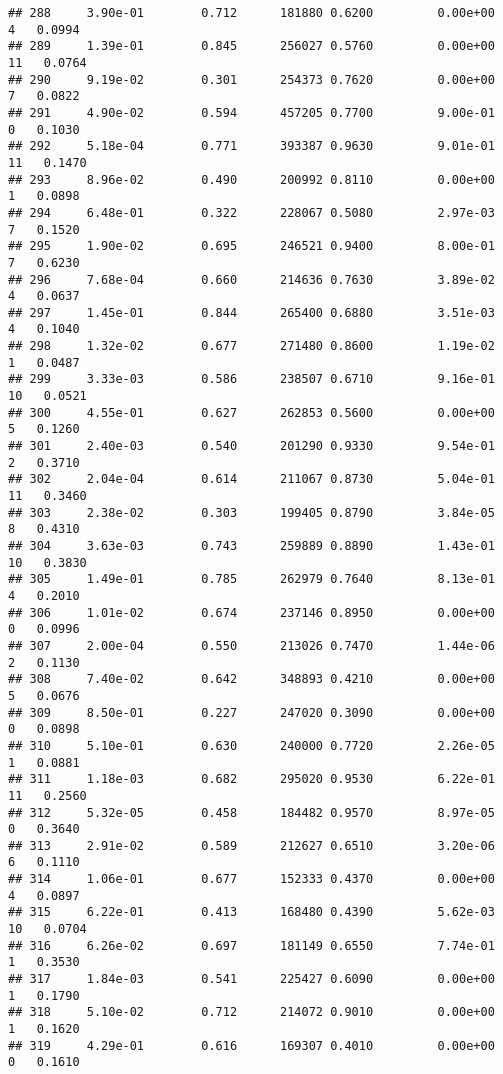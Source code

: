 \documentclass[
]{article}
\begin{document}
\begin{verbatim}
## 288     3.90e-01        0.712      181880 0.6200         0.00e+00   4   0.0994
## 289     1.39e-01        0.845      256027 0.5760         0.00e+00  11   0.0764
## 290     9.19e-02        0.301      254373 0.7620         0.00e+00   7   0.0822
## 291     4.90e-02        0.594      457205 0.7700         9.00e-01   0   0.1030
## 292     5.18e-04        0.771      393387 0.9630         9.01e-01  11   0.1470
## 293     8.96e-02        0.490      200992 0.8110         0.00e+00   1   0.0898
## 294     6.48e-01        0.322      228067 0.5080         2.97e-03   7   0.1520
## 295     1.90e-02        0.695      246521 0.9400         8.00e-01   7   0.6230
## 296     7.68e-04        0.660      214636 0.7630         3.89e-02   4   0.0637
## 297     1.45e-01        0.844      265400 0.6880         3.51e-03   4   0.1040
## 298     1.32e-02        0.677      271480 0.8600         1.19e-02   1   0.0487
## 299     3.33e-03        0.586      238507 0.6710         9.16e-01  10   0.0521
## 300     4.55e-01        0.627      262853 0.5600         0.00e+00   5   0.1260
## 301     2.40e-03        0.540      201290 0.9330         9.54e-01   2   0.3710
## 302     2.04e-04        0.614      211067 0.8730         5.04e-01  11   0.3460
## 303     2.38e-02        0.303      199405 0.8790         3.84e-05   8   0.4310
## 304     3.63e-03        0.743      259889 0.8890         1.43e-01  10   0.3830
## 305     1.49e-01        0.785      262979 0.7640         8.13e-01   4   0.2010
## 306     1.01e-02        0.674      237146 0.8950         0.00e+00   0   0.0996
## 307     2.00e-04        0.550      213026 0.7470         1.44e-06   2   0.1130
## 308     7.40e-02        0.642      348893 0.4210         0.00e+00   5   0.0676
## 309     8.50e-01        0.227      247020 0.3090         0.00e+00   0   0.0898
## 310     5.10e-01        0.630      240000 0.7720         2.26e-05   1   0.0881
## 311     1.18e-03        0.682      295020 0.9530         6.22e-01  11   0.2560
## 312     5.32e-05        0.458      184482 0.9570         8.97e-05   0   0.3640
## 313     2.91e-02        0.589      212627 0.6510         3.20e-06   6   0.1110
## 314     1.06e-01        0.677      152333 0.4370         0.00e+00   4   0.0897
## 315     6.22e-01        0.413      168480 0.4390         5.62e-03  10   0.0704
## 316     6.26e-02        0.697      181149 0.6550         7.74e-01   1   0.3530
## 317     1.84e-03        0.541      225427 0.6090         0.00e+00   1   0.1790
## 318     5.10e-02        0.712      214072 0.9010         0.00e+00   1   0.1620
## 319     4.29e-01        0.616      169307 0.4010         0.00e+00   0   0.1610

\end{verbatim}
\end{document}
